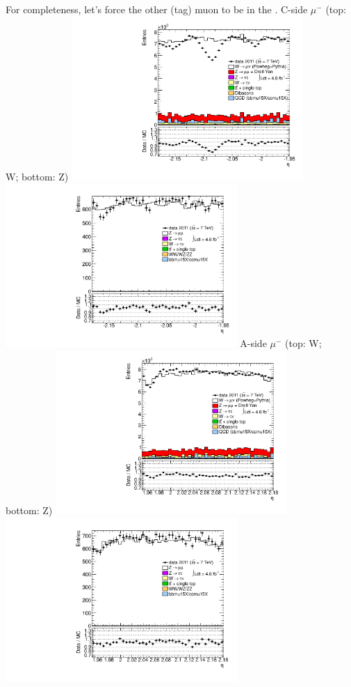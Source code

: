  {
For completeness, let's force the other (tag) muon to be in the .
}
 {
\colb[T]
C-side $\mu^{-}$ (top: W; bottom: Z)
\centering
\includegraphics[width=0.66\textwidth]{dates/20130306/figures/both/W_10_C_stack_l_eta_NEG} \\
\includegraphics[width=0.66\textwidth]{dates/20130306/figures/both/ZlOendcap_10_C_stack_lN_eta_ALL.pdf}
A-side $\mu^{-}$ (top: W; bottom: Z)
\centering
\includegraphics[width=0.66\textwidth]{dates/20130306/figures/both/W_10_A_stack_l_eta_NEG} \\
\includegraphics[width=0.66\textwidth]{dates/20130306/figures/both/ZlOendcap_10_A_stack_lN_eta_ALL.pdf} 
\cole
}

